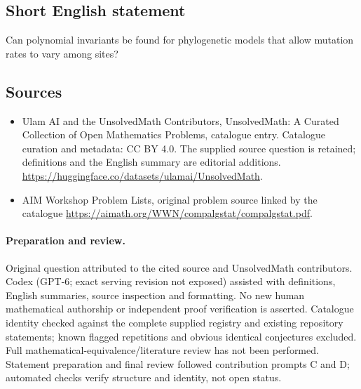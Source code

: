 \documentclass[11pt]{article}
\begin{document}
\subsection{Short English statement}
Can polynomial invariants be found for phylogenetic models that allow mutation rates to vary among sites?
\subsection{Sources}
\begin{itemize}
\item[\hypertarget{source:statement:1}{S1}] Ulam AI and the UnsolvedMath Contributors, UnsolvedMath: A Curated Collection of Open Mathematics Problems, catalogue entry. Catalogue curation and metadata: CC BY 4.0. The supplied source question is retained; definitions and the English summary are editorial additions.
\url{https://huggingface.co/datasets/ulamai/UnsolvedMath}.
\item[\hypertarget{source:statement:2}{S2}] AIM Workshop Problem Lists, original problem source linked by the catalogue
\url{https://aimath.org/WWN/compalgstat/compalgstat.pdf}.
\end{itemize}
\paragraph{Preparation and review.}
Original question attributed to the cited source and UnsolvedMath contributors. Codex (GPT-6; exact serving revision not exposed) assisted with definitions, English summaries, source inspection and formatting. No new human mathematical authorship or independent proof verification is asserted. Catalogue identity checked against the complete supplied registry and existing repository statements; known flagged repetitions and obvious identical conjectures excluded. Full mathematical-equivalence/literature review has not been performed. Statement preparation and final review followed contribution prompts C and D; automated checks verify structure and identity, not open status.
\label{end:statement}
\end{document}
